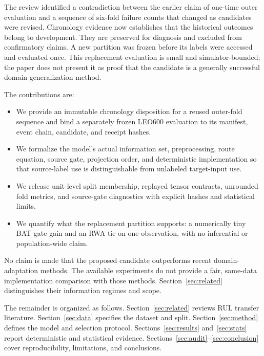 \documentclass[journal]{IEEEtran}
\begin{document}
The review identified a contradiction between the earlier claim of one-time outer evaluation and a sequence of six-fold failure counts that changed as candidates were revised. Chronology evidence now establishes that the historical outcomes belong to development. They are preserved for diagnosis and excluded from confirmatory claims. A new partition was frozen before its labels were accessed and evaluated once. This replacement evaluation is small and simulator-bounded; the paper does not present it as proof that the candidate is a generally successful domain-generalization method.

The contributions are:
\begin{itemize}
\item We provide an immutable chronology disposition for a reused outer-fold sequence and bind a separately frozen LEO600 evaluation to its manifest, event chain, candidate, and receipt hashes.
\item We formalize the model's actual information set, preprocessing, route equation, source gate, projection order, and deterministic implementation so that source-label use is distinguishable from unlabeled target-input use.
\item We release unit-level split membership, replayed tensor contracts, unrounded fold metrics, and source-gate diagnostics with explicit hashes and statistical limits.
\item We quantify what the replacement partition supports: a numerically tiny BAT gate gain and an RWA tie on one observation, with no inferential or population-wide claim.
\end{itemize}
No claim is made that the proposed candidate outperforms recent domain-adaptation methods. The available experiments do not provide a fair, same-data implementation comparison with those methods. Section~\ref{sec:related} distinguishes their information regimes and scope.

The remainder is organized as follows. Section~\ref{sec:related} reviews RUL transfer literature. Section~\ref{sec:data} specifies the dataset and split. Section~\ref{sec:method} defines the model and selection protocol. Sections~\ref{sec:results} and~\ref{sec:stats} report deterministic and statistical evidence. Sections~\ref{sec:audit}--\ref{sec:conclusion} cover reproducibility, limitations, and conclusions.
\end{document}
